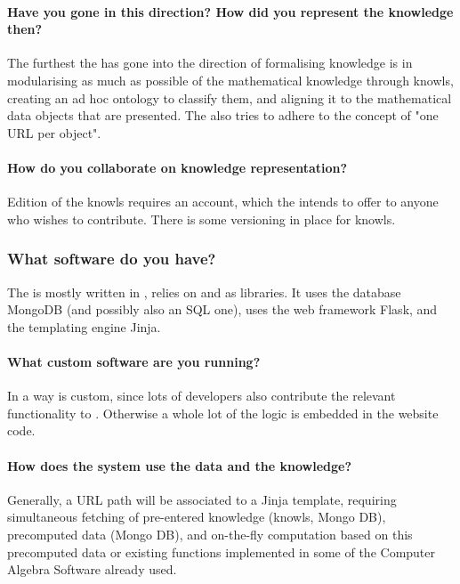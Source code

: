  \paragraph{Have you gone in this direction? How did you represent the knowledge then?}

The furthest the \LMFDB has gone into the direction of formalising knowledge is in modularising as much as possible of the mathematical knowledge through knowls, creating an ad hoc ontology to classify them, and aligning it to the mathematical data objects that are presented. The \LMFDB also tries to adhere to the concept of "one URL per object".

\paragraph{How do you collaborate on knowledge representation?}

Edition of the knowls requires an account, which the \LMFDB intends to offer to anyone who wishes to contribute. There is some versioning in place for knowls.

\subsubsection{What software do you have?}

 The \LMFDB is mostly written in \python, relies on \SageMath and \PariGP as libraries. It uses the database MongoDB (and possibly also an SQL one), uses the web framework Flask, and the templating engine Jinja.

 \paragraph{What custom software are you running?}

In a way \SageMath is custom, since lots of \LMFDB developers also contribute the relevant functionality to \SageMath. Otherwise a whole lot of the logic is embedded in the website code.

 \paragraph{How does the system use the data and the knowledge?}
Generally, a URL path will be associated to a Jinja template, requiring simultaneous fetching of pre-entered knowledge (knowls, Mongo DB), precomputed data (Mongo DB), and on-the-fly computation based on this precomputed data or existing functions implemented in some of the Computer Algebra Software already used.

